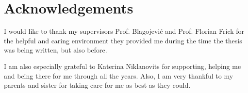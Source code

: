 \section*{Acknowledgements}
I would like to thank my supervisors Prof. Blagojevi\'c and Prof. Florian Frick for the helpful and caring environment they provided me during the time the thesis was being written, but also before.

I am also especially grateful to Katerina Niklanovits for supporting, helping me and being there for me through all the years. Also, I am very thankful to my parents and sister for taking care for me as best as they could.

